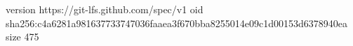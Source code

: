 version https://git-lfs.github.com/spec/v1
oid sha256:c4a6281a981637733747036faaea3f670bba8255014e09c1d00153d6378940ea
size 475
